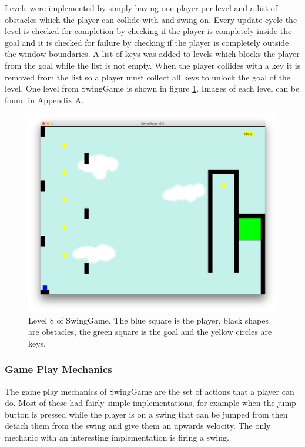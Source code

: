 \documentclass[]{report}
\begin{document}
			Levels were implemented by simply having one player per level and a list of obstacles which the player can collide with and swing on. Every update cycle the level is checked for completion by checking if the player is completely inside the goal and it is checked for failure by checking if the player is completely outside the window boundaries. A list of keys was added to levels which blocks the player from the goal while the list is not empty. When the player collides with a key it is removed from the list so a player must collect all keys to unlock the goal of the level. One level from SwingGame is shown in figure \ref{levelexample}. Images of each level can be found in Appendix A.
			
			\begin{figure}[H]
				\centering
				\includegraphics[scale=0.25]{level8}
				\caption{Level 8 of SwingGame. The blue square is the player, black shapes are obstacles, the green square is the goal and the yellow circles are keys.}
				\label{levelexample}
			\end{figure}
			\subsubsection{Game Play Mechanics}
			The game play mechanics of SwingGame are the set of actions that a player can do. Most of these had fairly simple implementations, for example when the jump button is pressed while the player is on a swing that can be jumped from then detach them from the swing and give them an upwards velocity. The only mechanic with an interesting implementation is firing a swing.
			
\end{document}

